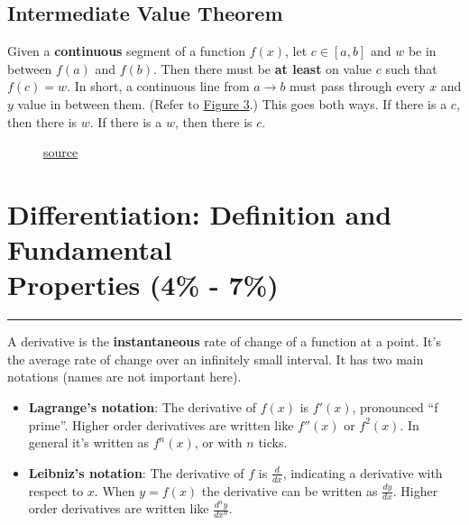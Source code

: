 \documentclass[12pt]{article}
\begin{document}
        \subsection{Intermediate Value Theorem}
            Given a \textbf{continuous} segment of a function $f(x)$, let $c \in [a, b]$ and $w$ be in between $f(a)$ and $f(b)$. Then there must be \textbf{at least} on value $c$ such that $f(c) = w$. In short, a continuous line from $a \to b$ must pass through every $x$ and $y$ value in between them. (Refer to \hyperref[fig:intvaltheorem]{Figure 3}.) This goes both ways. If there is a $c$, then there is  $w$. If there is a $w$, then there is $c$.

            \begin{figure}[H]
                \begin{center}
                    \caption{\href{https://www.mathsisfun.com/algebra/intermediate-value-theorem.html}{source}}
                    \label{fig:intvaltheorem}
                \end{center}
            \end{figure}

    \section[Differentiation: Definition and Fundamental Properties (4\% - 7\%)]{Differentiation: Definition and Fundamental \\Properties (4\% - 7\%)}
    \par\noindent\rule{\textwidth}{0.1pt}
        A derivative is the \textbf{instantaneous} rate of change of a function at a point. It's the average rate of change over an infinitely small interval. It has two main notations (names are not important here).
        \begin{itemize} %
            \item \textbf{Lagrange's notation}:
            The derivative of $f(x)$ is $f'(x)$, pronounced ``f prime''. Higher order derivatives are written like $f''(x)$ or $f^2(x)$. In general it's written as $f^{n}(x)$, or with $n$ ticks.
            \item \textbf{Leibniz's notation}:
            The derivative of $f$ is $\frac{d}{dx}$, indicating a derivative with respect to $x$. When $y=f(x)$ the derivative can be written as $\frac{dy}{dx}$. Higher order derivatives are written like $\frac{d^{n}y}{dx^{n}}$.
        \end{itemize}
\end{document}

